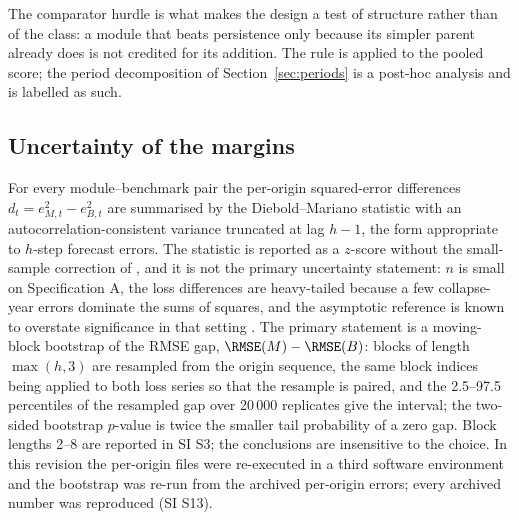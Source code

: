 \begin{center}
\end{center}

The comparator hurdle is what makes the design a test of structure rather than of the class: a module that beats persistence only because its simpler parent already does is not credited for its addition. The rule is applied to the pooled score; the period decomposition of Section~\ref{sec:periods} is a post-hoc analysis and is labelled as such.

\subsection{Uncertainty of the margins}\label{sec:uncertainty}

For every module--benchmark pair the per-origin squared-error differences $d_t = e^2_{M,t} - e^2_{B,t}$ are summarised by the Diebold--Mariano statistic \citep{Diebold1995} with an autocorrelation-consistent variance truncated at lag $h-1$, the form appropriate to $h$-step forecast errors. The statistic is reported as a $z$-score without the small-sample correction of \citet{Harvey1997}, and it is not the primary uncertainty statement: $n$ is small on Specification A, the loss differences are heavy-tailed because a few collapse-year errors dominate the sums of squares, and the asymptotic reference is known to overstate significance in that setting \citep{Diebold2015}. The primary statement is a moving-block bootstrap \citep{Kunsch1989} of the RMSE gap, $\RMSE(M)-\RMSE(B)$: blocks of length $\max(h,3)$ are resampled from the origin sequence, the same block indices being applied to both loss series so that the resample is paired, and the 2.5--97.5 percentiles of the resampled gap over 20\,000 replicates give the interval; the two-sided bootstrap $p$-value is twice the smaller tail probability of a zero gap. Block lengths 2--8 are reported in SI S3; the conclusions are insensitive to the choice. In this revision the per-origin files were re-executed in a third software environment and the bootstrap was re-run from the archived per-origin errors; every archived number was reproduced (SI S13).

